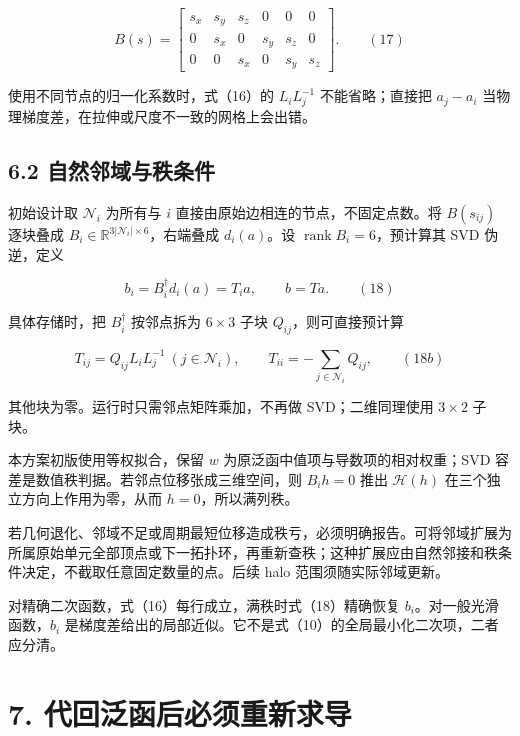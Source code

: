 \documentclass[
  11pt,
  a4paper,
]{article}
\begin{document}
\[
B(s)=\begin{bmatrix}
s_x&s_y&s_z&0&0&0\\
0&s_x&0&s_y&s_z&0\\
0&0&s_x&0&s_y&s_z
\end{bmatrix}. \qquad(17)
\]

使用不同节点的归一化系数时，式（16）的 \(L_iL_j^{-1}\) 不能省略；直接把
\(a_j-a_i\) 当物理梯度差，在拉伸或尺度不一致的网格上会出错。

\hypertarget{ux81eaux7136ux90bbux57dfux4e0eux79e9ux6761ux4ef6}{%
\subsection{6.2
自然邻域与秩条件}\label{ux81eaux7136ux90bbux57dfux4e0eux79e9ux6761ux4ef6}}

初始设计取 \(\mathcal N_i\) 为所有与 \(i\)
直接由原始边相连的节点，不固定点数。将 \(B(s_{ij})\) 逐块叠成
\(B_i\in\mathbb R^{3|\mathcal N_i|\times6}\)，右端叠成 \(d_i(a)\)。设
\(\operatorname{rank}B_i=6\)，预计算其 SVD 伪逆，定义

\[
b_i=B_i^\dagger d_i(a)=T_i a,
\qquad b=Ta. \qquad(18)
\]

具体存储时，把 \(B_i^\dagger\) 按邻点拆为 \(6\times3\) 子块
\(Q_{ij}\)，则可直接预计算

\[
T_{ij}=Q_{ij}L_iL_j^{-1}\ (j\in\mathcal N_i),\qquad
T_{ii}=-\sum_{j\in\mathcal N_i}Q_{ij}, \qquad(18b)
\]

其他块为零。运行时只需邻点矩阵乘加，不再做 SVD；二维同理使用
\(3\times2\) 子块。

本方案初版使用等权拟合，保留 \(w\) 为原泛函中值项与导数项的相对权重；SVD
容差是数值秩判据。若邻点位移张成三维空间，则 \(B_i h=0\) 推出
\(\mathcal H(h)\) 在三个独立方向上作用为零，从而 \(h=0\)，所以满列秩。

若几何退化、邻域不足或周期最短位移造成秩亏，必须明确报告。可将邻域扩展为所属原始单元全部顶点或下一拓扑环，再重新查秩；这种扩展应由自然邻接和秩条件决定，不截取任意固定数量的点。后续
halo 范围须随实际邻域更新。

对精确二次函数，式（16）每行成立，满秩时式（18）精确恢复
\(b_i\)。对一般光滑函数，\(b_i\)
是梯度差给出的局部近似。它不是式（10）的全局最小化二次项，二者应分清。

\hypertarget{ux4ee3ux56deux6cdbux51fdux540eux5fc5ux987bux91cdux65b0ux6c42ux5bfc}{%
\section{7.
代回泛函后必须重新求导}\label{ux4ee3ux56deux6cdbux51fdux540eux5fc5ux987bux91cdux65b0ux6c42ux5bfc}}
\end{document}
